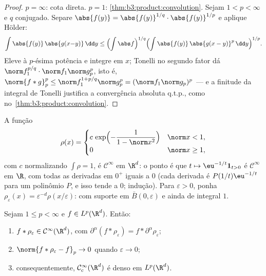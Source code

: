 \begin{proof}
$p = \infty$: cota direta. $p = 1$: \cref{thm:b3:product:convolution}. Sejam $1 < p < \infty$ e $q$
conjugado. Separe $\abs{f(y)} = \abs{f(y)}^{1/q}\cdot
\abs{f(y)}^{1/p}$ e aplique Hölder:
\[
\int\abs{f(y)}\,\abs{g(x{-}y)}\,\dd y
\leq \Bigl(\int\abs f\Bigr)^{1/q}
\Bigl(\int\abs{f(y)}\,\abs{g(x - y)}^p\,\dd y\Bigr)^{1/p} .
\]
Eleve à $p$-ésima potência e integre em $x$; Tonelli no segundo
fator dá $\norm f_1^{p/q}\cdot\norm f_1\norm g_p^p$, isto é, $\norm{f*g}_p^p \leq \norm f_1^{1 + p/q}\norm g_p^p =
(\norm f_1\norm g_p)^p$ --- e a finitude da integral de Tonelli
justifica a convergência absoluta q.t.p., como no~\cref{thm:b3:product:convolution}.
\end{proof}

\begin{definition}\label{def:b3:lp:mollifier}
A função
\[
\rho(x) = \begin{cases}
c\,\exp\Bigl(-\dfrac{1}{1 - \norm x^2}\Bigr) & \norm x < 1,\\
0 & \norm x \geq 1,
\end{cases}
\]
com $c$ normalizando $\int\rho = 1$, é $\mathcal C^\infty$ em $\R^d$: o ponto é que
$t \mapsto \eu^{-1/t}\mathbf
1_{t>0}$ é $\mathcal C^\infty$ em $\R$, com todas as derivadas em $0^+$ iguais a
$0$ (cada derivada é $P(1/t)\eu^{-1/t}$ para um polinômio $P$, e isso tende a
$0$; indução). Para $\varepsilon > 0$, ponha $\rho_\varepsilon(x) =
\varepsilon^{-d}\rho(x/\varepsilon)$: com suporte em $\bar B(0,
\varepsilon)$ e ainda
de integral $1$.
\end{definition}

\begin{theorem}[Regularização]\label{thm:b3:lp:regularization}
Sejam $1 \leq p < \infty$ e $f \in L^p(\R^d)$. Então:
\begin{enumerate}
  \item $f * \rho_\varepsilon \in \mathcal C^\infty(\R^d)$, com $\partial^\alpha(f * \rho_\varepsilon) = f *
        \partial^\alpha\rho_\varepsilon$;
  \item $\norm{f * \rho_\varepsilon - f}_p \to 0$ quando $\varepsilon \to 0$;
  \item consequentemente, $\mathcal C^\infty_c(\R^d)$ é denso em $L^p(\R^d)$.
\end{enumerate}
\end{theorem}

